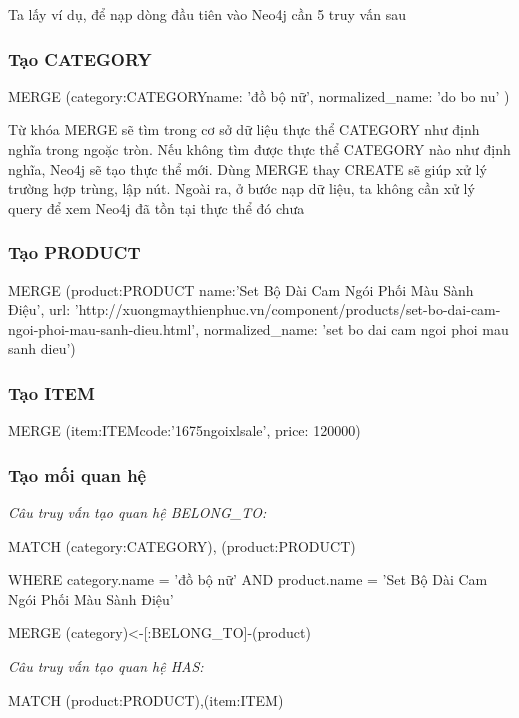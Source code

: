 Ta lấy ví dụ, để nạp dòng đầu tiên vào Neo4j cần 5 truy vấn sau

\subsubsection{Tạo CATEGORY}\label{sec:mergecategory}
MERGE (category:CATEGORY{name: 'đồ bộ nữ', normalized\_name: 'do bo nu' })

Từ khóa MERGE sẽ tìm trong cơ sở dữ liệu thực thể CATEGORY như định nghĩa trong ngoặc tròn. Nếu không tìm được thực thể CATEGORY nào như định nghĩa, Neo4j sẽ tạo thực thể mới. Dùng MERGE thay CREATE sẽ giúp xử lý trường hợp trùng, lập nút. Ngoài ra, ở bước nạp dữ liệu, ta không cần xử lý query để xem Neo4j đã tồn tại thực thể đó chưa 

\subsubsection{Tạo PRODUCT}\label{sec:mergeproduct}

MERGE (product:PRODUCT{ name:'Set Bộ Dài Cam Ngói Phối Màu Sành Điệu', url: 'http://xuongmaythienphuc.vn/component/products/set-bo-dai-cam-ngoi-phoi-mau-sanh-dieu.html', normalized\_name: 'set bo dai cam ngoi phoi mau sanh dieu'})

\subsubsection{Tạo ITEM}\label{sec:mergeitem}

MERGE (item:ITEM{code:'1675ngoixlsale', price: 120000})

\subsubsection{Tạo mối quan hệ}\label{sec:mergerel}

\textit{Câu truy vấn tạo quan hệ BELONG\_TO:} 

\medskip

MATCH (category:CATEGORY), (product:PRODUCT) 

WHERE category.name = 'đồ bộ nữ' AND product.name = 'Set Bộ Dài Cam Ngói Phối Màu Sành Điệu'

MERGE (category)<-[:BELONG\_TO]-(product)

\bigskip

\textit{Câu truy vấn tạo quan hệ HAS:}

\medskip

MATCH (product:PRODUCT),(item:ITEM) 

